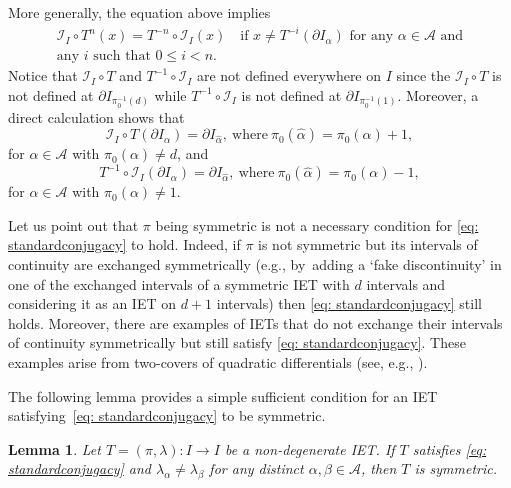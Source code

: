 \documentclass[10pt,a4paper]{amsart}
\theoremstyle{plain}
\newtheorem{lemma}[theorem]{Lemma}
\theoremstyle{definition}
\newcommand{\A}{\mathcal{A}}
\newcommand{\I}{\mathcal{I}}
\begin{document}
\pagebreak[2]
More generally, the equation above implies
\begin{multline}
\label{eq:generalized_conjugacy}
\mathcal{I}_I\circ T^n(x)=T^{-n}\circ\mathcal{I}_I(x) \quad \text{if } x \neq T^{-i}(\partial I_\alpha) \text{ for any } \alpha \in \A \text{ and}\\ \text{any $i$ such that } 0 \leq i < n.
\end{multline}
{Notice that $\I_I\circ T$ and $T^{-1}\circ \I_I$ are not defined everywhere on $I$ since the $\I_I\circ T$ is not defined at $\partial I_{\pi_0^{-1}(d)}$ while $T^{-1}\circ \I_I$ is not defined at $\partial I_{\pi_0^{-1}(1)}$.}
Moreover, {a direct calculation shows that}
\begin{equation}
\label{eq:sym_identity_endpoints}
\I_I\circ T(\partial I_{\alpha})=\partial I_{\hat\alpha},\ \text{where}\ \pi_0(\hat\alpha)=\pi_0(\alpha)+1,
\end{equation}
for $\alpha\in\A$ with $\pi_0(\alpha)\neq d$, and
\begin{equation}\label{eq:sym_identity_endpoints_2}
T^{-1}\circ \I_I(\partial I_{\alpha})=\partial I_{\hat\alpha},\ \text{where}\ \pi_0(\hat\alpha)=\pi_0(\alpha)-1,
\end{equation}
for $\alpha\in\A$ with $\pi_0(\alpha)\neq 1$.

Let us point out that $\pi$ being symmetric is not a necessary condition for \eqref{eq: standardconjugacy} to hold. Indeed, if $\pi$ is not symmetric but its intervals of continuity are exchanged symmetrically {(e.g., by~adding a `fake discontinuity' in one of the exchanged intervals of a symmetric IET with $d$ intervals and considering it as an IET on $d + 1$ intervals)} then \eqref{eq: standardconjugacy} still holds. Moreover, there are examples of IETs that do not exchange their intervals of continuity symmetrically but still satisfy \eqref{eq: standardconjugacy}. These examples arise from two-covers of quadratic differentials {(see, e.g., \cite{boissy_dynamics_2009}}).

The following lemma provides a simple sufficient condition for an IET satisfying~\eqref{eq: standardconjugacy} to be symmetric.

\begin{lemma}
\label{lem: condition for symmetric iets,}
Let $T=(\pi,\lambda): I \to I$ be a non-degenerate IET. If $T$ satisfies
\eqref{eq: standardconjugacy}
and $\lambda_{\alpha}\neq \lambda_{\beta}$ for any distinct $\alpha, \beta \in \mathcal{A}$, then $T$ is symmetric.
\end{lemma}
\end{document}
